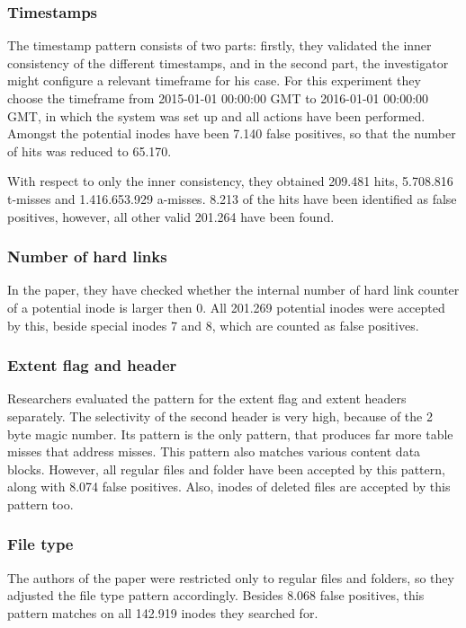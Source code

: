 \documentclass{acm_proc_article-sp}
\begin{document}
\subsubsection{Timestamps}

The timestamp pattern consists of two parts: firstly, they validated the inner consistency of the different timestamps, and in the second part, the investigator might configure a relevant timeframe for his case. For this experiment they choose the timeframe from 2015-01-01 00:00:00 GMT to 2016-01-01 00:00:00 GMT, in which the system was set up and all actions have been performed. Amongst the potential inodes have been 7.140 false positives, so that the number of hits was reduced to 65.170.

With respect to only the inner consistency, they obtained 209.481 hits, 5.708.816 t-misses and 1.416.653.929 a-misses. 8.213 of the hits have been identified as false positives, however, all other valid 201.264 have been found.

\subsubsection{Number of hard links}

In the paper, they have checked whether the internal number of hard link counter of a potential inode is larger then 0. All 201.269 potential inodes were accepted by this, beside special inodes 7 and 8, which are counted as false positives.

\subsubsection{Extent flag and header}

Researchers evaluated the pattern for the extent flag and extent headers separately. The selectivity of the second header is very high, because of the 2 byte magic number. Its pattern is the only pattern, that produces far more table misses that address misses. This pattern also matches various content data blocks. However, all regular files and folder have been accepted by this pattern, along with 8.074 false positives. 
Also, inodes of deleted files are accepted by this pattern too. 

\subsubsection{File type}

The authors of the paper were restricted only to regular files and folders, so they adjusted the file type pattern accordingly. Besides 8.068 false positives, this pattern matches on all 142.919 inodes they searched for.
\end{document}
